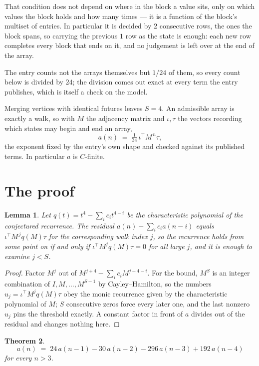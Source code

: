 \documentclass[11pt,a4paper]{article}
\theoremstyle{plain}
\newtheorem{theorem}{Theorem}
\newtheorem{lemma}[theorem]{Lemma}
\theoremstyle{definition}
\begin{document}
That condition does not depend on where in the block a value sits, only on which values the block holds and how many times --- it is a function of the block's multiset of entries. In particular it is decided by $2$ consecutive rows, the ones the block spans, so carrying the previous $1$ row as the state is enough: each new row completes every block that ends on it, and no judgement is left over at the end of the array.

The entry counts not the arrays themselves but $1/24$ of them, so every count below is divided by $24$; the division comes out exact at every term the entry publishes, which is itself a check on the model.

Merging vertices with identical futures leaves $S=4$. An admissible array is exactly a walk, so with $M$ the adjacency matrix and $\iota,\tau$ the vectors recording which states may begin and end an array,
\[
a(n)\;=\;\tfrac{1}{24}\,\iota^{\!\top}M^{\,n}\tau ,
\]
the exponent fixed by the entry's own shape and checked against its published terms. In
particular $a$ is $C$-finite.

\section{The proof}

\begin{lemma}\label{lem:crit}
Let $q(t)=t^{4}-\sum_i c_it^{4-i}$ be the characteristic polynomial of the
conjectured recurrence. The residual $a(n)-\sum_ic_ia(n-i)$ equals
$\iota^{\!\top}M^{\,j}q(M)\tau$ for the corresponding walk index $j$, so the recurrence
holds from some point on if and only if $\iota^{\!\top}M^{j}q(M)\tau=0$ for all large $j$,
and it is enough to examine $j<S$.
\end{lemma}

\begin{proof}
Factor $M^{j}$ out of $M^{j+4}-\sum_ic_iM^{j+4-i}$. For the bound, $M^{S}$
is an integer combination of $I,M,\dots,M^{S-1}$ by Cayley--Hamilton, so the numbers
$u_j=\iota^{\!\top}M^{j}q(M)\tau$ obey the monic recurrence given by the characteristic
polynomial of $M$; $S$ consecutive zeros force every later one, and the last nonzero $u_j$
pins the threshold exactly. A constant factor in front of $a$ divides out of the residual and
changes nothing here.
\end{proof}

\begin{theorem}
\[
a(n)\;=\;24\,a(n-1) - 30\,a(n-2) - 296\,a(n-3) + 192\,a(n-4)
\]
for every $n>3$.
\end{theorem}
\end{document}
